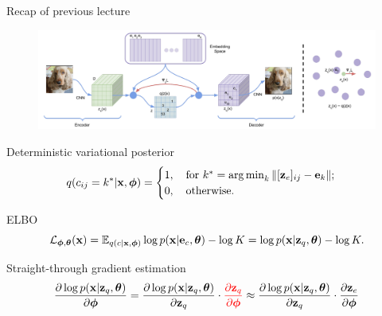 \begin{frame}{Recap of previous lecture}
	\begin{figure}
		\centering
		\includegraphics[width=0.85\linewidth]{figs/vqvae}
	\end{figure}
	\vspace{-0.3cm}
	\begin{block}{Deterministic variational posterior}
		\vspace{-0.8cm}
		\[
			q(c_{ij} = k^* | \mathbf{x}, \boldsymbol{\phi}) = \begin{cases}
				1 , \quad \text{for } k^* = \operatorname*{arg\,min}_k \| [\mathbf{z}_e]_{ij} - \mathbf{e}_k \|; \\
				0, \quad \text{otherwise}.
			\end{cases}
		\]
		\vspace{-0.8cm}
	\end{block}
	\begin{block}{ELBO}
		\vspace{-0.6cm}
		\[
			\mathcal{L}_{\boldsymbol{\phi}, \boldsymbol{\theta}}(\mathbf{x})  = \mathbb{E}_{q(c | \mathbf{x}, \boldsymbol{\phi})} \log p(\mathbf{x} | \mathbf{e}_{c} , \boldsymbol{\theta}) - \log K =  \log p(\mathbf{x} | \mathbf{z}_q, \boldsymbol{\theta}) - \log K.
		\]
		\vspace{-0.6cm}
	\end{block}
	\begin{block}{Straight-through gradient estimation}
		\vspace{-0.6cm}
		\[
			\frac{\partial \log p(\mathbf{x} | \mathbf{z}_q , \boldsymbol{\theta})}{\partial \boldsymbol{\phi}} = \frac{\partial \log p(\mathbf{x} | \mathbf{z}_q, \boldsymbol{\theta})}{\partial \mathbf{z}_q} \cdot {\color{red}\frac{\partial \mathbf{z}_q}{\partial \boldsymbol{\phi}}} \approx \frac{\partial \log p(\mathbf{x} | \mathbf{z}_q, \boldsymbol{\theta})}{\partial \mathbf{z}_q} \cdot \frac{\partial \mathbf{z}_e}{\partial \boldsymbol{\phi}}
		\]
	\end{block}
\end{frame}
